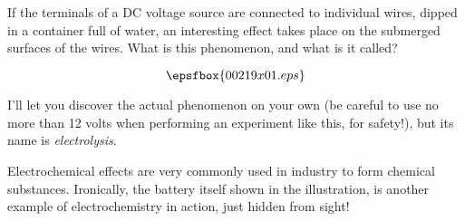 

If the terminals of a DC voltage source are connected to individual wires, dipped in a container full of water, an interesting effect takes place on the submerged surfaces of the wires.  What is this phenomenon, and what is it called?

$$\epsfbox{00219x01.eps}$$







I'll let you discover the actual phenomenon on your own (be careful to use no more than 12 volts when performing an experiment like this, for safety!), but its name is {\it electrolysis}.







Electrochemical effects are very commonly used in industry to form chemical substances.  Ironically, the battery itself shown in the illustration, is another example of electrochemistry in action, just hidden from sight!




